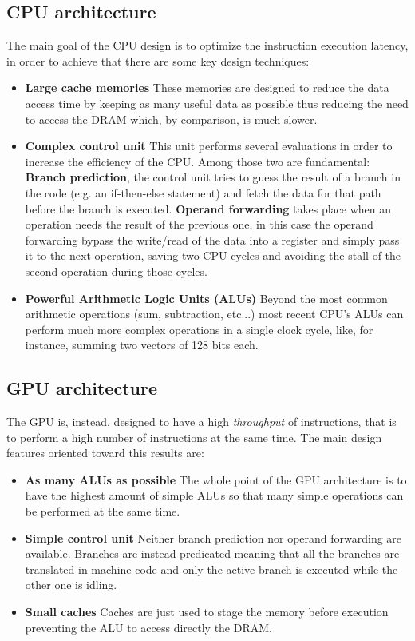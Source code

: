 \subsection{CPU architecture}
The main goal of the CPU design is to optimize the instruction execution latency, in order to achieve that there are some key design techniques:
\begin{itemize}
\item \textbf{Large cache memories} These memories are designed to reduce the data access time by keeping as many useful data as possible thus reducing the need to access the DRAM which, by comparison, is much slower.
\item \textbf{Complex control unit} This unit performs several evaluations in order to increase the efficiency of the CPU. Among those two are fundamental: \textbf{Branch prediction}, the control unit tries to guess the result of a branch in the code (e.g. an if-then-else statement) and fetch the data for that path before the branch is executed. \textbf{Operand forwarding} takes place when an operation needs the result of the previous one, in this case the operand forwarding bypass the write/read of the data into a register and simply pass it to the next operation, saving two CPU cycles and avoiding the stall of the second operation during those cycles.
\item \textbf{Powerful Arithmetic Logic Units (ALUs)} Beyond the most common arithmetic operations (sum, subtraction, etc...) most recent CPU's ALUs can perform much more complex operations in a single clock cycle, like, for instance, summing two vectors of 128 bits each.
\end{itemize}

\subsection{GPU architecture}
The GPU is, instead, designed to have a high \textit{throughput} of instructions, that is to perform a high number of instructions at the same time. The main design features oriented toward this results are:
\begin{itemize}
\item{\textbf{As many ALUs as possible}} The whole point of the GPU architecture is to have the highest amount of simple ALUs so that many simple operations can be performed at the same time.
\item{\textbf{Simple control unit}} Neither branch prediction nor operand forwarding are available. Branches are instead predicated meaning that all the branches are translated in machine code and only the active branch is executed while the other one is idling.
\item{\textbf{Small caches}} Caches are just used to stage the memory before execution preventing the ALU to access directly the DRAM.
\end{itemize}

